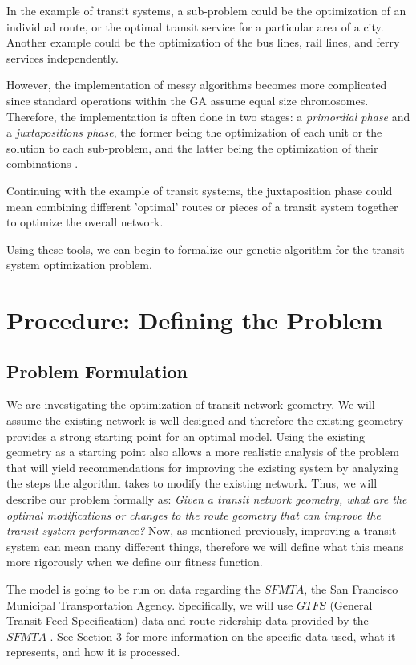 \documentclass[11pt]{amsart}
\theoremstyle{definition}                  %
\theoremstyle{remark}                       %
\numberwithin{equation}{section}
\begin{document}
In the example of transit systems, a sub-problem could be the optimization of an individual route, or the optimal transit service for a particular area of a city. Another example could be the optimization of the bus lines, rail lines, and ferry services independently.

However, the implementation of messy algorithms becomes more complicated since standard operations within the GA assume equal size chromosomes. Therefore, the implementation is often done in two stages: a \textit{primordial phase} and a \textit{juxtapositions phase}, the former being the optimization of each unit or the solution to each sub-problem, and the latter being the optimization of their combinations \cite{mitchell1998}. 

Continuing with the example of transit systems, the juxtaposition phase could mean combining different 'optimal' routes or pieces of a transit system together to optimize the overall network. 

Using these tools, we can begin to formalize our genetic algorithm for the transit system optimization problem. 

\section{Procedure: Defining the Problem}
\subsection{Problem Formulation}
We are investigating the optimization of transit network geometry. We will assume the existing network is well designed and therefore the existing geometry provides a strong starting point for an optimal model. Using the existing geometry as a starting point also allows a more realistic analysis of the problem that will yield recommendations for improving the existing system by analyzing the steps the algorithm takes to modify the existing network. Thus, we will describe our problem formally as: \newline
\textit{Given a transit network geometry, what are the optimal modifications or changes to the route geometry that can improve the transit system performance?}
Now, as mentioned previously, improving a transit system can mean many different things, therefore we will define what this means more rigorously when we define our fitness function. 

The model is going to be run on data regarding the $SFMTA$, the San Francisco Municipal Transportation Agency. Specifically, we will use $GTFS$ (General Transit Feed Specification) data and route ridership data provided by the $SFMTA$ \cite{SFMTA}. See Section 3 for more information on the specific data used, what it represents, and how it is processed. 
\end{document}
